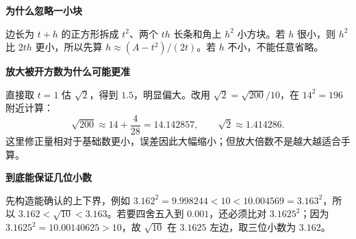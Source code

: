 \clearpage
\begin{explanationbox}
\textbf{\textcolor{CExplanation}{为什么忽略一小块}}
\par\medskip
\begin{center}

\end{center}
\medskip
边长为 $t+h$ 的正方形拆成 $t^2$、两个 $th$ 长条和角上 $h^2$ 小方块。若 $h$ 很小，则 $h^2$ 比 $2th$ 更小，所以先算 $h\approx(A-t^2)/(2t)$。若 $h$ 不小，不能任意省略。
\end{explanationbox}
\clearpage
\begin{explanationbox}
\textbf{\textcolor{CExplanation}{放大被开方数为什么可能更准}}
\par\medskip
\begin{center}

\end{center}
\medskip
直接取 $t=1$ 估 $\sqrt2$，得到 $1.5$，明显偏大。改用 $\sqrt2=\sqrt{200}/10$，在 $14^2=196$ 附近计算：\[\sqrt{200}\approx14+\frac4{28}=14.142857,\qquad\sqrt2\approx1.414286.\]这里修正量相对于基础数更小，误差因此大幅缩小；但放大倍数不是越大越适合手算。
\end{explanationbox}
\clearpage
\begin{explanationbox}
\textbf{\textcolor{CExplanation}{到底能保证几位小数}}
\par\medskip
\begin{center}

\end{center}
\medskip
先构造能确认的上下界，例如 $3.162^2=9.998244<10<10.004569=3.163^2$，所以 $3.162<\sqrt{10}<3.163$。若要四舍五入到 $0.001$，还必须比对 $3.1625^2$；因为 $3.1625^2=10.00140625>10$，故 $\sqrt{10}$ 在 $3.1625$ 左边，取三位小数为 $3.162$。
\end{explanationbox}
